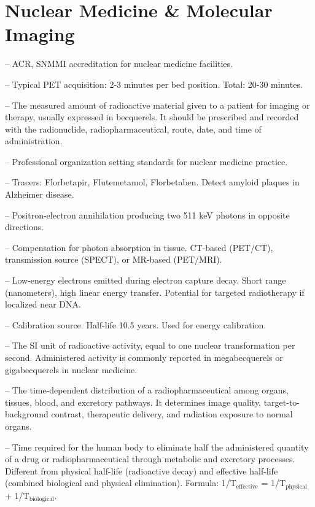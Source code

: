 \chapter{Nuclear Medicine \& Molecular Imaging}

-- ACR, SNMMI accreditation for nuclear medicine facilities.

-- Typical PET acquisition: 2-3 minutes per bed position. Total: 20-30 minutes.

-- The measured amount of radioactive material given to a patient for imaging or therapy, usually expressed in becquerels. It should be prescribed and recorded with the radionuclide, radiopharmaceutical, route, date, and time of administration.

-- Professional organization setting standards for nuclear medicine practice.

-- Tracers: Florbetapir, Flutemetamol, Florbetaben. Detect amyloid plaques in Alzheimer disease.

-- Positron-electron annihilation producing two 511 keV photons in opposite directions.


-- Compensation for photon absorption in tissue. CT-based (PET/CT), transmission source (SPECT), or MR-based (PET/MRI).

-- Low-energy electrons emitted during electron capture decay. Short range (nanometers), high linear energy transfer. Potential for targeted radiotherapy if localized near DNA.

-- Calibration source. Half-life 10.5 years. Used for energy calibration.

-- The SI unit of radioactive activity, equal to one nuclear transformation per second. Administered activity is commonly reported in megabecquerels or gigabecquerels in nuclear medicine.

-- The time-dependent distribution of a radiopharmaceutical among organs, tissues, blood, and excretory pathways. It determines image quality, target-to-background contrast, therapeutic delivery, and radiation exposure to normal organs.

-- Time required for the human body to eliminate half the administered quantity of a drug or radiopharmaceutical through metabolic and excretory processes. Different from physical half-life (radioactive decay) and effective half-life (combined biological and physical elimination). Formula: 1/T$_\mathrm{effective}$ = 1/T$_\mathrm{physical}$ + 1/T$_\mathrm{biological}$.

